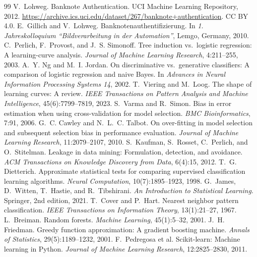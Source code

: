 \documentclass{article}
\begin{document}
\begin{thebibliography}{99}
 V.~Lohweg. Banknote Authentication. UCI Machine Learning Repository, 2012. \url{https://archive.ics.uci.edu/dataset/267/banknote+authentication}. CC BY 4.0.
 E.~Gillich and V.~Lohweg. Banknotenauthentifizierung. In \emph{1. Jahreskolloquium ``Bildverarbeitung in der Automation''}, Lemgo, Germany, 2010.
 C.~Perlich, F.~Provost, and J.~S. Simonoff. Tree induction vs.\ logistic regression: A learning-curve analysis. \emph{Journal of Machine Learning Research}, 4:211--255, 2003.
 A.~Y. Ng and M.~I. Jordan. On discriminative vs.\ generative classifiers: A comparison of logistic regression and naive Bayes. In \emph{Advances in Neural Information Processing Systems 14}, 2002.
 T.~Viering and M.~Loog. The shape of learning curves: A review. \emph{IEEE Transactions on Pattern Analysis and Machine Intelligence}, 45(6):7799--7819, 2023.
 S.~Varma and R.~Simon. Bias in error estimation when using cross-validation for model selection. \emph{BMC Bioinformatics}, 7:91, 2006.
 G.~C. Cawley and N.~L.~C. Talbot. On over-fitting in model selection and subsequent selection bias in performance evaluation. \emph{Journal of Machine Learning Research}, 11:2079--2107, 2010.
 S.~Kaufman, S.~Rosset, C.~Perlich, and O.~Stitelman. Leakage in data mining: Formulation, detection, and avoidance. \emph{ACM Transactions on Knowledge Discovery from Data}, 6(4):15, 2012.
 T.~G. Dietterich. Approximate statistical tests for comparing supervised classification learning algorithms. \emph{Neural Computation}, 10(7):1895--1923, 1998.
 G.~James, D.~Witten, T.~Hastie, and R.~Tibshirani. \emph{An Introduction to Statistical Learning}. Springer, 2nd edition, 2021.
 T.~Cover and P.~Hart. Nearest neighbor pattern classification. \emph{IEEE Transactions on Information Theory}, 13(1):21--27, 1967.
 L.~Breiman. Random forests. \emph{Machine Learning}, 45(1):5--32, 2001.
 J.~H. Friedman. Greedy function approximation: A gradient boosting machine. \emph{Annals of Statistics}, 29(5):1189--1232, 2001.
 F.~Pedregosa et al. Scikit-learn: Machine learning in Python. \emph{Journal of Machine Learning Research}, 12:2825--2830, 2011.
\end{thebibliography}


\end{document}
